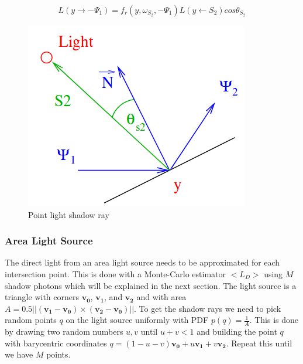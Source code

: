 \documentclass[a4paper, twocolumn]{article}
\begin{document}
            \begin{equation*}
              L(y \rightarrow -\Psi_1) = f_r(y, \omega_{S_2}, -\Psi_1) L(y \leftarrow S_2) cos\theta_{S_2}
            \end{equation*}
            
            \begin{figure}[ht]
              \centering
              \includegraphics[width=\linewidth]{share/point_light.png}
              \caption{Point light shadow ray}
            \end{figure}

            \subsubsection{Area Light Source} \label{sec:area_light_source}
            The direct light from an area light source needs to be approximated for each intersection point. This is done with a Monte-Carlo estimator $<L_D>$ using $M$ shadow photons which will be explained in the next section. The light source is a triangle with corners $\mathbf{v_0}$, $\mathbf{v_1}$, and $\mathbf{v_2}$ and with area $A = 0.5 ||(\mathbf{v_1} - \mathbf{v_0})\times(\mathbf{v_2}-\mathbf{v_0})||$. To get the shadow rays we need to pick random points $q$ on the light source uniformly with PDF $p(q) = \frac{1}{A}$. This is done by drawing two random numbers $u, v$ until $u + v < 1$ and building the point $q$ with barycentric coordinates $q = (1-u-v)\mathbf{v_0} + u\mathbf{v_1} + v\mathbf{v_2}$. Repeat this until we have $M$ points. 
\end{document}
